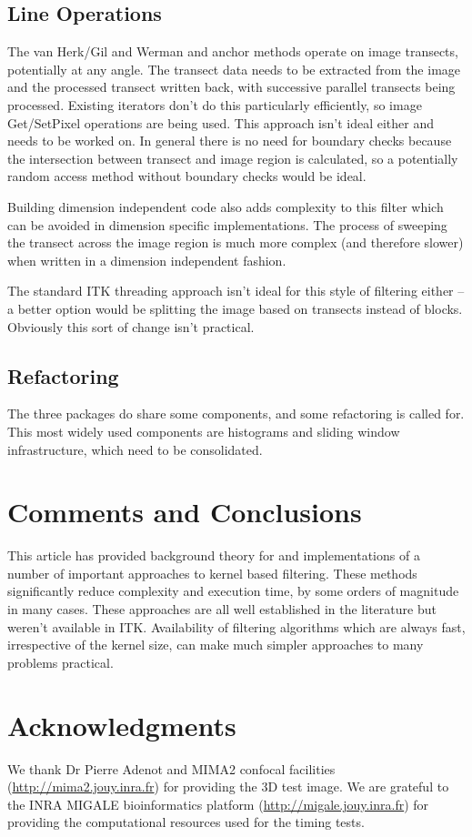 \documentclass[a4paper]{InsightArticle}
\begin{document}
\subsection{Line Operations}
The van Herk/Gil and Werman and anchor methods operate on image transects, potentially
at any angle. The transect data needs to be extracted from the image and the processed
transect written back, with successive parallel transects being processed. 
Existing iterators don't do this particularly efficiently, so image Get/SetPixel operations 
are being used. This approach isn't ideal either and needs to be worked on. In general
there is no need for boundary checks because the intersection between transect and image region
is calculated, so a potentially random access method without boundary checks would be ideal.

Building dimension independent code also adds complexity to this filter which can be avoided in
dimension specific implementations. The process of sweeping the transect across the image region
is much more complex (and therefore slower) when written in a dimension independent fashion.

The standard ITK threading approach isn't ideal for this style of filtering either -- a better 
option would be splitting the image based on transects instead of blocks. Obviously this
sort of change isn't practical.

\subsection{Refactoring}
The three packages do share some components, and some refactoring is
called for. This most widely used components are histograms and
sliding window infrastructure, which need to be consolidated.

\section{Comments and Conclusions}
This article has provided background theory for and implementations of
a number of important approaches to kernel based filtering. These
methods significantly reduce complexity and execution time, by some
orders of magnitude in many cases. These approaches are all well
established in the literature but weren't available in
ITK. Availability of filtering algorithms which are always fast,
irrespective of the kernel size, can make much simpler approaches to
many problems practical.

\section{Acknowledgments}
We thank Dr Pierre Adenot and MIMA2 confocal facilities
(\url{http://mima2.jouy.inra.fr}) for providing the 3D test image.
We are grateful to the INRA MIGALE bioinformatics platform
(\url{http://migale.jouy.inra.fr}) for providing the computational resources
used for the timing tests.
\end{document}
